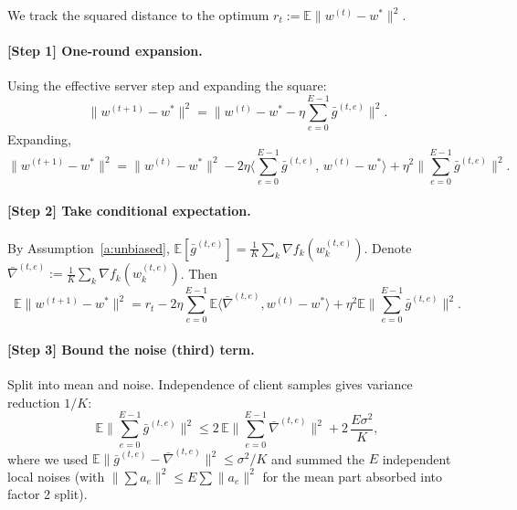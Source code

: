 \documentclass[11pt]{article}
\begin{document}
We track the squared distance to the optimum
$r_t := \mathbb{E}\|w^{(t)} - w^*\|^2$.

\paragraph{[Step 1] One-round expansion.}
Using the effective server step and expanding the square:
\[
\|w^{(t+1)}-w^*\|^2
= \Big\| w^{(t)} - w^* - \eta\sum_{e=0}^{E-1}\bar g^{(t,e)} \Big\|^2 .
\]
Expanding,
\[
\|w^{(t+1)}-w^*\|^2
= \|w^{(t)}-w^*\|^2
- 2\eta \Big\langle \sum_{e=0}^{E-1}\bar g^{(t,e)},\, w^{(t)}-w^* \Big\rangle
+ \eta^2 \Big\| \sum_{e=0}^{E-1}\bar g^{(t,e)} \Big\|^2 .
\]

\paragraph{[Step 2] Take conditional expectation.}
By Assumption~\ref{a:unbiased}, $\mathbb{E}[\bar g^{(t,e)}] = \frac1K\sum_k \nabla f_k(w_k^{(t,e)})$.
Denote $\bar\nabla^{(t,e)} := \frac1K\sum_k \nabla f_k(w_k^{(t,e)})$. Then
\[
\mathbb{E}\|w^{(t+1)}-w^*\|^2
= r_t
- 2\eta \sum_{e=0}^{E-1}\mathbb{E}\big\langle \bar\nabla^{(t,e)}, w^{(t)}-w^*\big\rangle
+ \eta^2 \mathbb{E}\Big\|\sum_{e=0}^{E-1}\bar g^{(t,e)}\Big\|^2 .
\]

\paragraph{[Step 3] Bound the noise (third) term.}
Split into mean and noise. Independence of client samples gives variance reduction $1/K$:
\[
\mathbb{E}\Big\|\sum_{e=0}^{E-1}\bar g^{(t,e)}\Big\|^2
\le 2\,\mathbb{E}\Big\|\sum_{e=0}^{E-1}\bar\nabla^{(t,e)}\Big\|^2
+ 2\,\frac{E\sigma^2}{K},
\]
where we used $\mathbb{E}\|\bar g^{(t,e)}-\bar\nabla^{(t,e)}\|^2 \le \sigma^2/K$ and
summed the $E$ independent local noises (with $\|\sum a_e\|^2\le E\sum\|a_e\|^2$ for the mean part absorbed into factor 2 split).
\end{document}
